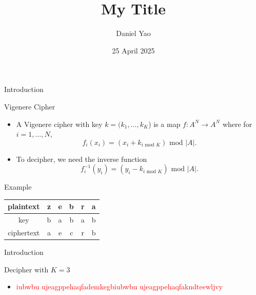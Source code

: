 \documentclass{beamer}
\title[Your Short Title]{My Title}
\author{Daniel Yao}
\institute{Johns Hopkins University}
\date{25 April 2025}
\begin{document}
\begin{frame}

\titlepage

\end{frame}


\begin{frame}{Introduction}

\begin{block}{Vigenere Cipher \cite{vigenere1586}}
\begin{itemize}
\item A Vigenere cipher with key $k = (k_{1}, \ldots, k_{K}$) is a map $f: A^{N} \to A^{N}$ where for $i = 1, \ldots, N$,
$$f_{i}(x_{i}) = (x_{i} + k_{i \text{ mod } K}) \text{ mod } |A|.$$
\item To decipher, we need the inverse function 
$$f^{-1}_{i}(y_{i}) = (y_{i} - k_{i \text{ mod } K}) \text{ mod } |A|.$$
\end{itemize}
\end{block}

\begin{block}{Example}
\end{block}

\vspace{-12pt}

\begin{center}
\begin{tabular}{cccccc}
  plaintext & z & e & b & r & a \\
  \hline
  key & b & a & b & a & b \\
  \hline
  ciphertext & a & e & c & r & b \\
\end{tabular}
\end{center}

\end{frame}


\begin{frame}{Introduction}

\begin{block}{Decipher with $K=3$}
\begin{itemize}
\item \textcolor{red}{iubwbu ujeagppehaqfademkegbiubwbu ujeagppehaqfakndteewljvy}
\end{itemize}
\end{block}

\end{frame}

\end{document}
